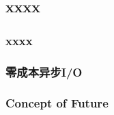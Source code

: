 \subsection{xxxx} %
\begin{frame}[fragile]
    \frametitle{xxxx}
\end{frame}
% 
% 
\begin{frame}[fragile]
    \frametitle{零成本异步I/O}
\end{frame}
% 
% 
% 
% 
% 
% 
% 
\begin{frame}[fragile]
    \frametitle{Concept of Future}
\end{frame}
% 
% 
% 
% 
% 
